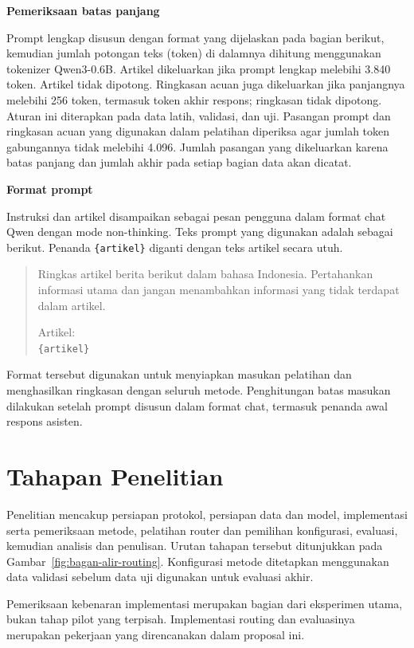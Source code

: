 \medskip
\noindent\textbf{Pemeriksaan batas panjang}\par\smallskip

Prompt lengkap disusun dengan format yang dijelaskan pada bagian berikut, kemudian jumlah potongan teks (token) di dalamnya dihitung menggunakan tokenizer Qwen3-0.6B. Artikel dikeluarkan jika prompt lengkap melebihi 3.840 token. Artikel tidak dipotong. Ringkasan acuan juga dikeluarkan jika panjangnya melebihi 256 token, termasuk token akhir respons; ringkasan tidak dipotong. Aturan ini diterapkan pada data latih, validasi, dan uji. Pasangan prompt dan ringkasan acuan yang digunakan dalam pelatihan diperiksa agar jumlah token gabungannya tidak melebihi 4.096. Jumlah pasangan yang dikeluarkan karena batas panjang dan jumlah akhir pada setiap bagian data akan dicatat.

\medskip
\noindent\textbf{Format prompt}\par\smallskip

Instruksi dan artikel disampaikan sebagai pesan pengguna dalam format chat Qwen dengan mode non-thinking. Teks prompt yang digunakan adalah sebagai berikut. Penanda \texttt{\{artikel\}} diganti dengan teks artikel secara utuh.

\begin{quote}
Ringkas artikel berita berikut dalam bahasa Indonesia. Pertahankan informasi utama dan jangan menambahkan informasi yang tidak terdapat dalam artikel.

Artikel:\\
\texttt{\{artikel\}}
\end{quote}

Format tersebut digunakan untuk menyiapkan masukan pelatihan dan menghasilkan ringkasan dengan seluruh metode. Penghitungan batas masukan dilakukan setelah prompt disusun dalam format chat, termasuk penanda awal respons asisten.

\section{Tahapan Penelitian}

Penelitian mencakup persiapan protokol, persiapan data dan model, implementasi serta pemeriksaan metode, pelatihan router dan pemilihan konfigurasi, evaluasi, kemudian analisis dan penulisan. Urutan tahapan tersebut ditunjukkan pada Gambar~\ref{fig:bagan-alir-routing}. Konfigurasi metode ditetapkan menggunakan data validasi sebelum data uji digunakan untuk evaluasi akhir.

Pemeriksaan kebenaran implementasi merupakan bagian dari eksperimen utama, bukan tahap pilot yang terpisah. Implementasi routing dan evaluasinya merupakan pekerjaan yang direncanakan dalam proposal ini.


